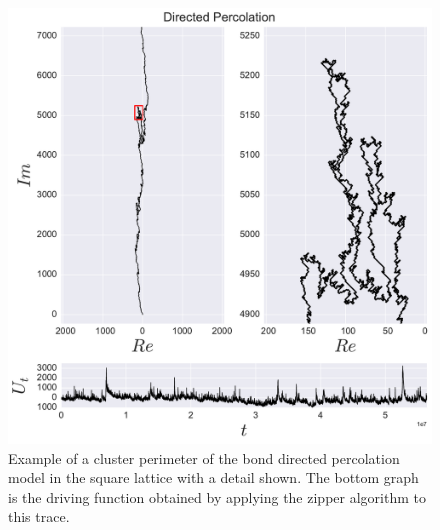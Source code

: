 \begin{figure}
\begin{center}
    \includegraphics[scale=0.5]{chapters/ch6-asle/figs/dp_trdr}
\end{center}
\caption{Example of a cluster perimeter of the bond directed percolation model
    in the square lattice with a detail shown. The bottom graph is the driving
    function obtained by applying the zipper algorithm to this trace.}
\label{fig:dp_trdr}
\end{figure}
